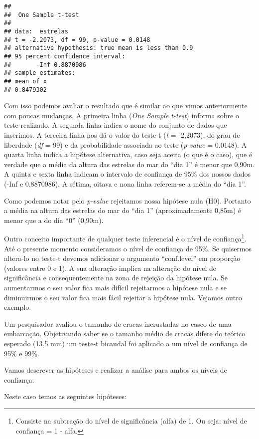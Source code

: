 \documentclass[14pt,titlepage, oneside, openany, a4paper]{book}
\begin{document}
\begin{verbatim}
## 
##  One Sample t-test
## 
## data:  estrelas
## t = -2.2073, df = 99, p-value = 0.0148
## alternative hypothesis: true mean is less than 0.9
## 95 percent confidence interval:
##       -Inf 0.8870986
## sample estimates:
## mean of x 
## 0.8479302
\end{verbatim}

Com isso podemos avaliar o resultado que é similar ao que vimos anteriormente com poucas mudanças. A primeira linha (\emph{One Sample t-test}) informa sobre o teste realizado. A segunda linha indica o nome do conjunto de dados que inserimos. A terceira linha nos dá o valor do teste-t (\emph{t} = -2,2073), do grau de liberdade (\emph{df} = 99) e da probabilidade associada ao teste (\emph{p-value} = 0.0148). A quarta linha indica a hipótese alternativa, caso seja aceita (o que é o caso), que é verdade que a média da altura das estrelas do mar do ``dia 1'' é menor que 0,90m. A quinta e sexta linha indicam o intervalo de confiança de 95\% dos nossos dados (-Inf e 0,8870986). A sétima, oitava e nona linha referem-se a média do ``dia 1''.

Como podemos notar pelo \emph{p-value} rejeitamos nossa hipótese nula (H0). Portanto a média na altura das estrelas do mar do ``dia 1'' (aproximadamente 0,85m) é menor que a do dia ``0'' (0,90m).

Outro conceito importante de qualquer teste inferencial é o nível de confiança\footnote{Consiste na subtração do nível de significância (alfa) de 1. Ou seja: nível de confiança = 1 - alfa.}. Até o presente momento consideramos o nível de confiança de 95\%. Se quisermos altera-lo no teste-t devemos adicionar o argumento ``conf.level'' em proporção (valores entre 0 e 1). A sua alteração implica na alteração do nível de significância e consequentemente na zona de rejeição da hipótese nula. Se aumentarmos o seu valor fica mais difícil rejeitarmos a hipótese nula e se diminuirmos o seu valor fica mais fácil rejeitar a hipótese nula. Vejamos outro exemplo.

Um pesquisador avaliou o tamanho de cracas incrustadas no casco de uma embarcação. Objetivando saber se o tamanho médio de cracas difere do teórico esperado (13,5 mm) um teste-t bicaudal foi aplicado a um nível de confiança de 95\% e 99\%.

Vamos descrever as hipóteses e realizar a análise para ambos os níveis de confiança.

Neste caso temos as seguintes hipóteses:
\end{document}
